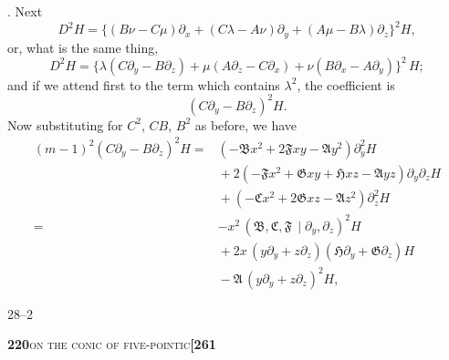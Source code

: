 \documentclass[11pt]{article}
\newcommand{\Cdel}{\mid}
\begin{document}
. Next
\[
D^2 H = \bigl\{(B\nu - C\mu)\partial_x + (C\lambda - A\nu)\partial_y + (A\mu - B\lambda)\partial_z\bigr\}^2 H,
\]
or, what is the same thing,
\[
D^2 H = \bigl\{\lambda(C\partial_y - B\partial_z) + \mu(A\partial_z - C\partial_x) + \nu(B\partial_x - A\partial_y)\bigr\}^2\,H;
\]
and if we attend first to the term which contains $\lambda^2$, the coefficient is
\[
(C\partial_y - B\partial_z)^2 H.
\]
Now substituting for $C^2$, $CB$, $B^2$ as before, we have
\[
\begin{aligned}
(m-1)^2(C\partial_y - B\partial_z)^2 H ={}& (-\mathfrak{B}x^2 + 2\mathfrak{F}xy - \mathfrak{A}y^2)\partial_y^2 H\\
&{}+ 2(-\mathfrak{F}x^2 + \mathfrak{G}xy + \mathfrak{H}xz - \mathfrak{A}yz)\partial_y\partial_z H\\
&{}+ (-\mathfrak{C}x^2 + 2\mathfrak{G}xz - \mathfrak{A}z^2)\partial_z^2 H\\
={}& -x^2\,(\mathfrak{B}, \mathfrak{C}, \mathfrak{F}\,\Cdel\partial_y, \partial_z)^2 H\\
&{}+ 2x\,(y\partial_y + z\partial_z)(\mathfrak{H}\partial_y + \mathfrak{G}\partial_z)H\\
&{}- \mathfrak{A}\,(y\partial_y + z\partial_z)^2 H,
\end{aligned}
\]

\hfill 28--2

\newpage

\noindent\textbf{220}\hfill\textsc{on the conic of five-pointic}\hfill\textbf{[261}

\medskip
\end{document}
